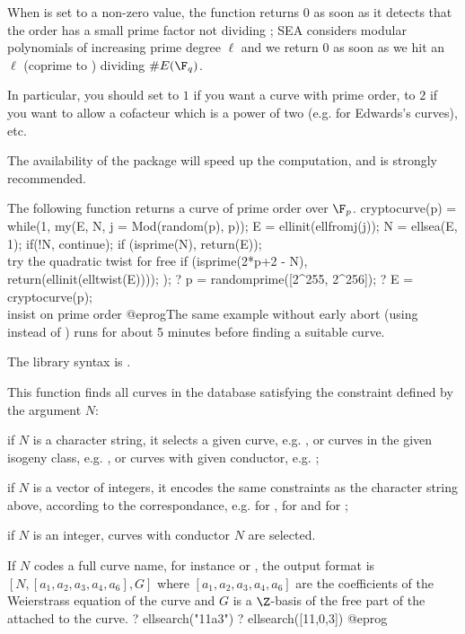 \item When  is set to a non-zero value, the function returns $0$
as soon as it detects that the order has a small prime factor not dividing
; SEA considers modular polynomials of increasing prime degree
$\ell$ and we return $0$ as soon as we hit an $\ell$ (coprime to )
dividing $\#E(\F_q)$.

In particular, you should set  to $1$ if you want a curve with
prime order, to $2$ if you want to allow a cofacteur which is a power of two
(e.g. for Edwards's curves), etc.

The availability of the  package will speed up the computation,
and is strongly recommended.

The following function returns a curve of prime order over $\F_p$.
\bprog
cryptocurve(p) =
{
  while(1,
    my(E, N, j = Mod(random(p), p));
    E = ellinit(ellfromj(j));
    N = ellsea(E, 1); if(!N, continue);
    if (isprime(N), return(E));
    \\ try the quadratic twist for free
    if (isprime(2*p+2 - N), return(ellinit(elltwist(E))));
  );
}
? p = randomprime([2^255, 2^256]);
? E = cryptocurve(p); \\ insist on prime order
@eprog\noindent The same example without early abort (using 
instead of ) runs for about 5 minutes before finding a
suitable curve.

The library syntax is .

\label{se:ellsearch}
This function finds all curves in the  database satisfying
the constraint defined by the argument $N$:

\item if $N$ is a character string, it selects a given curve, e.g.
, or curves in the given isogeny class, e.g. , or
curves with given conductor, e.g. ;

\item if $N$ is a vector of integers, it encodes the same constraints
as the character string above, according to the 
correspondance, e.g. \kbd{[11,0,1]} for , \kbd{[11,0]} for
 and \kbd{[11]} for ;

\item if $N$ is an integer, curves with conductor $N$ are selected.

If $N$ codes a full curve name, for instance  or \kbd{[11,0,1]},
the output format is $[N, [a_1,a_2,a_3,a_4,a_6], G]$ where
$[a_1,a_2,a_3,a_4,a_6]$ are the coefficients of the Weierstrass equation of
the curve and $G$ is a $\Z$-basis of the free part of the
 attached to the curve.
\bprog
? ellsearch("11a3")
? ellsearch([11,0,3])
@eprog\noindent

